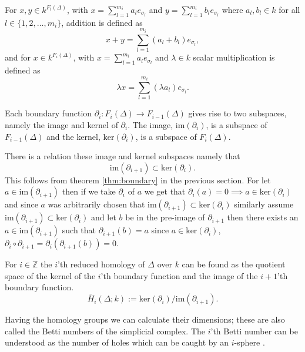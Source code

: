 \documentclass[11pt,a4paper,twoside]{report}
\begin{document}
For $x,y\in k^{F_i(\Delta)}$, with $x = \sum_{l=1}^{m_i}a_le_{\sigma_l}$ and $y = \sum_{l=1}^{m_i}b_le_{\sigma_l}$ where $a_l,b_l\in k$ for all $l\in\{1,2,\dots,m_i\}$, addition is defined as 
\begin{equation*}
x+y = \sum_{l=1}^{m_i}(a_l+b_l)e_{\sigma_l},
\end{equation*}
and for $x\in k^{F_i(\Delta)}$, with $x = \sum_{l=1}^{m_i}a_le_{\sigma_l}$ and $\lambda \in k$ scalar multiplication is defined as 
\begin{equation*}
\lambda x = \sum_{l=1}^{m_i}(\lambda a_l)e_{\sigma_l}.
\end{equation*}

Each boundary function $\partial_i:F_i(\Delta)\to F_{i-1}(\Delta)$ gives rise to two subspaces, namely the image and kernel of $\partial_i$. The image, $\textrm{im}(\partial_i)$, is a subspace of $F_{i-1}(\Delta)$ and the kernel, $\textrm{ker}(\partial_i)$, is a subspace of $F_{i}(\Delta)$. 

There is a relation these image and kernel subspaces namely that 
\begin{equation*}
\textrm{im}(\partial_{i+1})\subset\textrm{ker}(\partial_i).
\end{equation*}
This follows from theorem \ref{thm:boundary} in the previous section. 
For let $a\in \textrm{im}(\partial_{i+1})$ then if we take $\partial_i$ of $a$ we get that $\partial_i(a)=0\implies a\in \textrm{ker}(\partial_i)$ and since $a$ was arbitrarily chosen that $\textrm{im}(\partial_{i+1})\subset \textrm{ker}(\partial_i)$ 
similarly assume $\textrm{im}(\partial_{i+1})\subset \textrm{ker}(\partial_i)$ and let $b$ be in the pre-image of $\partial_{i+1}$ then there exists an $a\in\textrm{im}(\partial_{i+1})$ such that 
$\partial_{i+1}(b)=a$ since $a\in\textrm{ker}(\partial_i)$, $\partial_i\circ\partial_{i+1}=\partial_i(\partial_{i+1}(b))=0$. 

For $i\in\mathbb{Z}$ the $i$'th reduced homology of $\Delta$ over $k$ can be found as the quotient space of the kernel of the $i$'th boundary function and the image of the $i+1$'th boundary function. \cite[p.2]{Allgaier}
\begin{equation}
\bar{H}_i(\Delta;k):=\textrm{ker}(\partial_i)/\textrm{im}(\partial_{i+1}).
\end{equation}

Having the homology groups we can calculate their dimensions; these are also called the Betti numbers of the simplicial complex. The $i$'th Betti number can be understood as the number of holes which can be caught by an $i$-sphere \cite{wikiBetti}.
\end{document}
